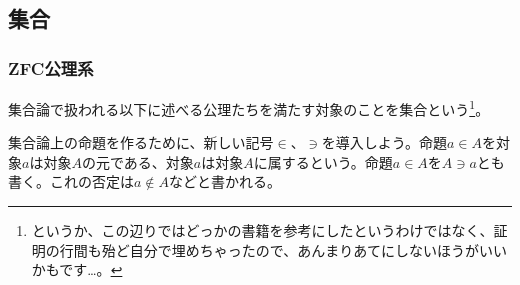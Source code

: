 \documentclass[a4paper]{jsarticle}
\begin{document}
\subsection{集合}%
\subsubsection{ZFC公理系}%
\begin{dfn}
集合論で扱われる以下に述べる公理たちを満たす対象のことを集合という\footnote{というか、この辺りではどっかの書籍を参考にしたというわけではなく、証明の行間も殆ど自分で埋めちゃったので、あんまりあてにしないほうがいいかもです…。}。
\end{dfn}
\begin{dfn}
集合論上の命題を作るために、新しい記号$\in$、$\ni$を導入しよう。命題$a \in A$を対象$a$は対象$A$の元である、対象$a$は対象$A$に属するという。命題$a \in A$を$A \ni a$とも書く。これの否定は$a \notin A$などと書かれる。
\end{dfn}
\end{document}
